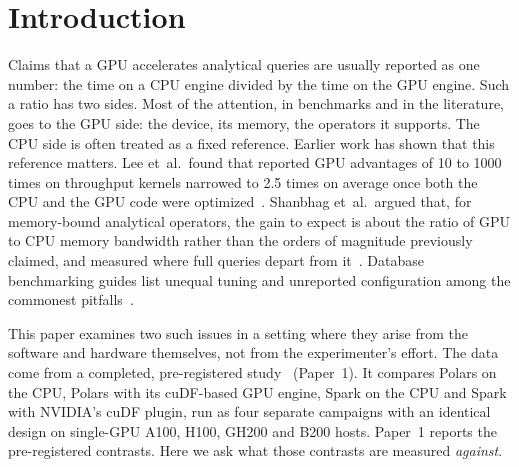 \documentclass[11pt]{article}
\begin{document}
\section{Introduction}
\label{sec:intro}

Claims that a GPU accelerates analytical queries are usually reported as one
number: the time on a CPU engine divided by the time on the GPU engine. Such a
ratio has two sides. Most of the attention, in benchmarks and in the
literature, goes to the GPU side: the device, its memory, the operators it
supports. The CPU side is often treated as a fixed reference. Earlier work has
shown that this reference matters. Lee et~al.\ found that reported
GPU advantages of 10 to 1000 times on throughput kernels narrowed to 2.5 times
on average once both the CPU and the GPU code were
optimized~\citep{lee2010debunking}. Shanbhag et~al.\ argued that, for
memory-bound analytical operators, the gain to expect is about the ratio of GPU
to CPU memory bandwidth rather than the orders of magnitude previously claimed,
and measured where full queries depart from it~\citep{shanbhag2020gpucpu}. Database benchmarking
guides list unequal tuning and unreported configuration among the commonest
pitfalls~\citep{raasveldt2018fair,hoefler2015scientific}.

This paper examines two such issues in a setting where they arise from the
software and hardware themselves, not from the experimenter's effort. The data
come from a completed, pre-registered study~\citep{ejiofor2026companion}
(Paper~1). It compares Polars on the CPU, Polars with its cuDF-based GPU
engine, Spark on the CPU and Spark with NVIDIA's cuDF plugin, run as four
separate campaigns with an identical design on single-GPU A100, H100, GH200
and B200 hosts. Paper~1 reports the pre-registered contrasts. Here we ask what
those contrasts are measured \emph{against}.
\end{document}
